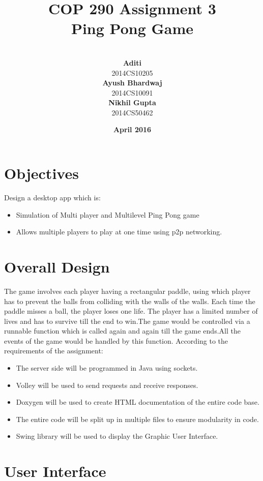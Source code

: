 \documentclass{article}
\title{\vspace*{\fill} \textbf{COP 290 Assignment 3}
	  \\ {\Large \textbf{Ping Pong Game}}
}
\author{
	\vspace{5mm} \\
	 \textbf{Aditi}\\
	2014CS10205 \vspace{2mm} \\
	\textbf{Ayush Bhardwaj}\\ 
	2014CS10091 \vspace{2mm} \\
	\textbf{Nikhil Gupta}\\ 
	2014CS50462 \vspace{2mm}
}
\date{\vspace{3mm} \textbf{April 2016} \vspace*{\fill}}
\begin{document}
	\maketitle

	\newpage

	\tableofcontents

	\newpage

	\section{Objectives}
	Design a desktop app which is:
	\begin{itemize}
	\item Simulation of Multi player and Multilevel Ping Pong game
	\item Allows multiple players to play at one time using p2p networking.
	\end{itemize}

	\section{Overall Design}
		The game involves each player having a rectangular paddle, using which player has to prevent the balls from colliding with the walls of the walls. Each time the paddle misses a ball, the player loses one life. The player has a limited number of lives and has to survive till the end to win.The game would be controlled via a runnable function which is called again and again till the game ends.All the events of the game would be handled by this function. According to the requirements of the assignment:
				\begin{itemize}
			\item The server side will be programmed in Java using sockets.
			\item Volley will be used to send requests and receive responses.
			\item Doxygen will be used to create HTML documentation of the entire code base.
			\item The entire code will be split up in multiple files to ensure modularity in code.
			\item Swing library will be used to display the Graphic User Interface.
		\end{itemize}
	\section{User Interface}
	
\end{document}
